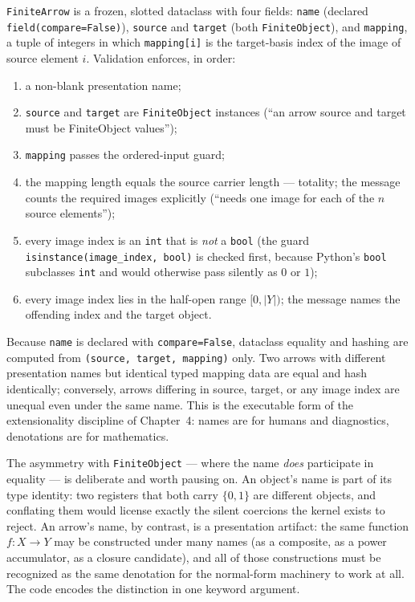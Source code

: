 \begin{construction}\label{ch09:con:arrow}
\texttt{FiniteArrow} is a frozen, slotted dataclass with four fields:
\texttt{name} (declared \texttt{field(compare=False)}), \texttt{source} and
\texttt{target} (both \texttt{FiniteObject}), and \texttt{mapping}, a tuple
of integers in which \texttt{mapping[i]} is the target-basis index of the
image of source element $i$. Validation enforces, in order:
\begin{enumerate}
\item a non-blank presentation name;
\item \texttt{source} and \texttt{target} are \texttt{FiniteObject}
      instances (``an arrow source and target must be FiniteObject
      values'');
\item \texttt{mapping} passes the ordered-input guard;
\item the mapping length equals the source carrier length --- totality; the
      message counts the required images explicitly (``needs one image for
      each of the $n$ source elements'');
\item every image index is an \texttt{int} that is \emph{not} a
      \texttt{bool} (the guard \texttt{isinstance(image\_index, bool)} is
      checked first, because Python's \texttt{bool} subclasses
      \texttt{int} and would otherwise pass silently as $0$ or $1$);
\item every image index lies in the half-open range $[0, |Y|)$; the message
      names the offending index and the target object.
\end{enumerate}
\end{construction}

\begin{invariant}\label{ch09:inv:extensional}
Because \texttt{name} is declared with \texttt{compare=False}, dataclass
equality and hashing are computed from \texttt{(source, target, mapping)}
only. Two arrows with different presentation names but identical typed
mapping data are equal and hash identically; conversely, arrows differing
in source, target, or any image index are unequal even under the same name.
This is the executable form of the extensionality discipline of Chapter~4:
names are for humans and diagnostics, denotations are for mathematics.
\end{invariant}

The asymmetry with \texttt{FiniteObject} --- where the name \emph{does}
participate in equality --- is deliberate and worth pausing on. An object's
name is part of its type identity: two registers that both carry
$\{0,1\}$ are different objects, and conflating them would license exactly
the silent coercions the kernel exists to reject. An arrow's name, by
contrast, is a presentation artifact: the same function $f : X \to Y$ may be
constructed under many names (as a composite, as a power accumulator, as a
closure candidate), and all of those constructions must be recognized as the
same denotation for the normal-form machinery to work at all. The code
encodes the distinction in one keyword argument.


